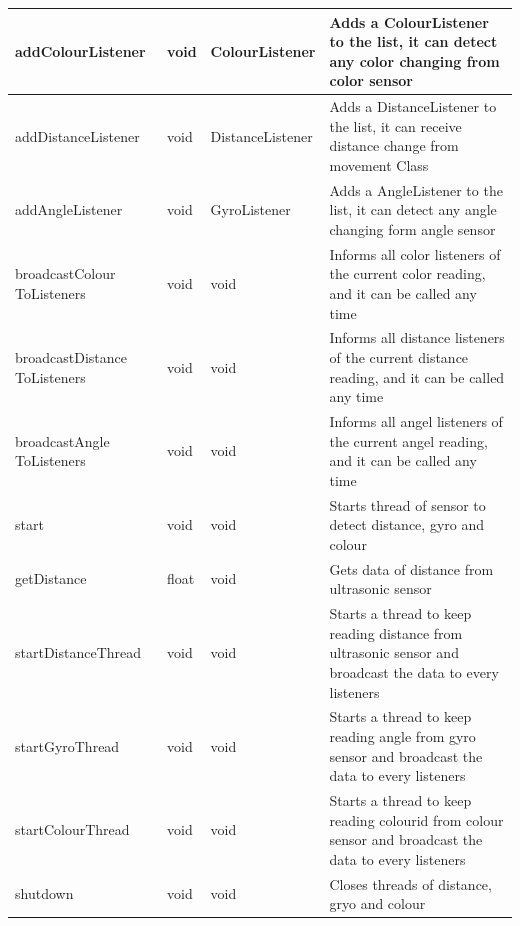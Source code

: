 \documentclass[12pt]{article}
\begin{document}
\begin{supertabular}
{ | p{0.27\textwidth} | p{0.25\textwidth} |p{0.25\textwidth}|p{0.28\textwidth}|}
\hline
addColourListener & void & ColourListener & Adds a ColourListener to the list, it can detect any color changing from color sensor  \\
\hline
addDistanceListener & void & DistanceListener & Adds a DistanceListener to the list, it can receive distance change from movement Class \\
\hline
addAngleListener & void & GyroListener & Adds a AngleListener to the list, it can detect any angle changing form angle sensor\\
\hline
broadcastColour ToListeners & void & void & Informs all color listeners of the current color reading, and it can be called any time \\
\hline
broadcastDistance ToListeners & void & void & Informs all distance listeners of the current distance reading, and it can be called any time \\
\hline
broadcastAngle ToListeners & void & void & Informs all angel listeners of the current angel reading, and it can be called any time\\
\hline
start & void & void & Starts thread of sensor to detect distance, gyro and colour  \\
\hline
getDistance & float & void & Gets data of distance from ultrasonic sensor \\
\hline
startDistanceThread & void & void & Starts a thread to keep reading distance from ultrasonic sensor and broadcast the data to every listeners \\
\hline
startGyroThread & void & void & Starts a thread to keep reading angle from gyro sensor and broadcast the data to every listeners \\
\hline
startColourThread & void & void & Starts a thread to keep reading colourid from colour sensor and broadcast the data to every listeners \\
\hline
shutdown & void & void & Closes threads of distance, gryo and colour\\
\hline
\end{supertabular}
\end{document}
